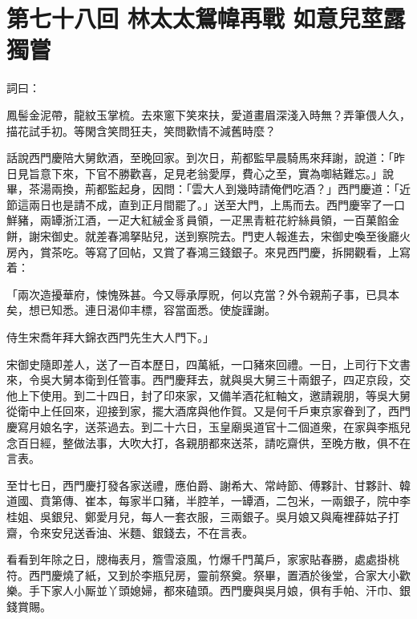 
\chapter*{第七十八回 林太太鴛幃再戰 如意兒莖露獨嘗}


詞曰：

\begin{myquote}
鳳髻金泥帶，龍紋玉掌梳。去來窻下笑來扶，愛道畫眉深淺入時無？弄筆偎人久，描花試手初。等閑含笑問狂夫，笑問歡情不減舊時麼？
\end{myquote}

話說西門慶陪大舅飲酒，至晚回家。到次日，荊都監早晨騎馬來拜謝，說道：「昨日見旨意下來，下官不勝歡喜，足見老翁愛厚，費心之至，實為啣結難忘。」說畢，茶湯兩換，荊都監起身，因問：「雲大人到幾時請俺們吃酒？」西門慶道：「近節這兩日也是請不成，直到正月間罷了。」送至大門，上馬而去。西門慶宰了一口鮮豬，兩罈浙江酒，一疋大紅絨金豸員領，一疋黑青粧花紵絲員領，一百菓餡金餅，謝宋御史。就差春鴻拏貼兒，送到察院去。門吏人報進去，宋御史喚至後廳火房內，賞茶吃。等寫了回帖，又賞了春鴻三錢銀子。來見西門慶，拆開觀看，上寫着：

\begin{myquote}[\markfont]
「兩次造擾華府，悚愧殊甚。今又辱承厚貺，何以克當？外令親荊子事，已具本矣，想已知悉。連日渴仰丰標，容當面悉。使旋謹謝。

侍生宋喬年拜大錦衣西門先生大人門下。」
\end{myquote}

宋御史隨即差人，送了一百本歷日，四萬紙，一口豬來回禮。一日，上司行下文書來，令吳大舅本衛到任管事。西門慶拜去，就與吳大舅三十兩銀子，四疋京段，交他上下使用。到二十四日，封了印來家，又備羊酒花紅軸文，邀請親朋，等吳大舅從衛中上任回來，迎接到家，擺大酒席與他作賀。又是何千戶東京家眷到了，西門慶寫月娘名字，送茶過去。到二十六日，玉皇廟吳道官十二個道衆，在家與李瓶兒念百日經，整做法事，大吹大打，各親朋都來送茶，請吃齋供，至晚方散，俱不在言表。

至廿七日，西門慶打發各家送禮，應伯爵、謝希大、常峙節、傅夥計、甘夥計、韓道國、賁第傳、崔本，每家半口豬，半腔羊，一罈酒，二包米，一兩銀子，院中李桂姐、吳銀兒、鄭愛月兒，每人一套衣服，三兩銀子。{}吳月娘又與庵裡薛姑子打齋，令來安兒送香油、米麵、銀錢去，不在言表。

看看到年除之日，牕梅表月，簷雪滾風，{}竹爆千門萬戶，家家貼春勝，處處掛桃符。西門慶燒了紙，又到於李瓶兒房，靈前祭奠。祭畢，置酒於後堂，合家大小歡樂。手下家人小厮並丫頭媳婦，都來磕頭。西門慶與吳月娘，俱有手帕、汗巾、銀錢賞賜。


